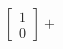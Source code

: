 \documentclass[preview]{standalone}
\begin{document}
\begin{align*}
\begin{bmatrix} 1 \\ 0 \end{bmatrix} +
\end{align*}
\end{document}

